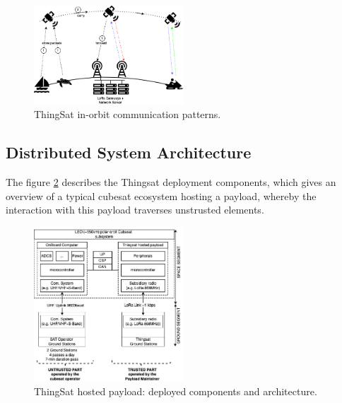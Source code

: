 \begin{figure}[t]
    \centering
    \includegraphics[width=0.5\textwidth]{Figures/thingsat-dtn.png}
    \caption{ThingSat in-orbit communication patterns.}
    \label{fig:thingsat-comm}
\end{figure}



\subsection{Distributed System Architecture}

The figure \ref{fig:thingsat-archi} describes the Thingsat deployment components, which gives an
overview of a typical cubesat ecosystem hosting a payload, whereby the interaction with this payload traverses unstrusted elements.

\begin{figure}[ht]
    \includegraphics[width=0.5\textwidth]{Figures/globecom-thingsat.jpg}
    \caption{ThingSat hosted payload: deployed components and architecture.}
    \label{fig:thingsat-archi}
\end{figure}

